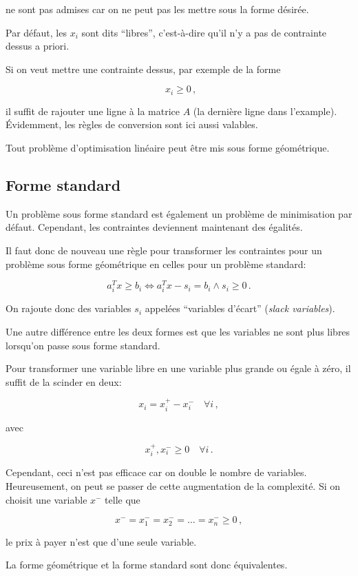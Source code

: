 	ne sont pas admises car on ne peut pas les mettre sous la forme désirée.


	Par défaut, les $x_i$ sont dits ``libres'',
	c'est-à-dire qu'il n'y a pas de contrainte dessus a priori.

	Si on veut mettre une contrainte dessus, par exemple de la forme

	\[
	\phantom{,} x_i \ge 0\,,
	\]

	il suffit de rajouter une ligne à la matrice $A$
	(la dernière ligne dans l'example).
	Évidemment, les règles de conversion sont ici aussi valables.


	Tout problème d'optimisation linéaire
	peut être mis sous forme géométrique.

\subsection{Forme standard}

	Un problème sous forme standard est également
	un problème de minimisation par défaut.
	Cependant, les contraintes deviennent maintenant des égalités.


	Il faut donc de nouveau une règle
	pour transformer les contraintes
	pour un problème sous forme géométrique
	en celles pour un problème standard:

	\[
	a_i^T x \ge b_i \iff a_i^T x - s_i = b_i \land s_i \ge 0\,.
	\]

	On rajoute donc des variables $s_i$ appelées
	``variables d'écart'' (\emph{slack variables}).

	Une autre différence entre les deux formes est
	que les variables ne sont plus libres
	lorsqu'on passe sous forme standard.

	Pour transformer une variable libre
	en une variable plus grande ou égale à zéro,
	il suffit de la scinder en deux:

	\[
	x_i = x_i^+ - x_i^- \quad \forall i\,,
	\]

	avec

	\[
	x_i^+, x_i^- \ge 0 \quad \forall i\,.
	\]

	Cependant, ceci n'est pas efficace
	car on double le nombre de variables.
	Heureusement, on peut se passer de cette augmentation de la complexité.
	Si on choisit une variable $x^-$ telle que

	\[
	x^- = x_1^- = x_2^- = \dots = x_n^- \ge 0\,,
	\]

	le prix à payer n'est que d'une seule variable.

	La forme géométrique et la forme standard sont donc équivalentes.


